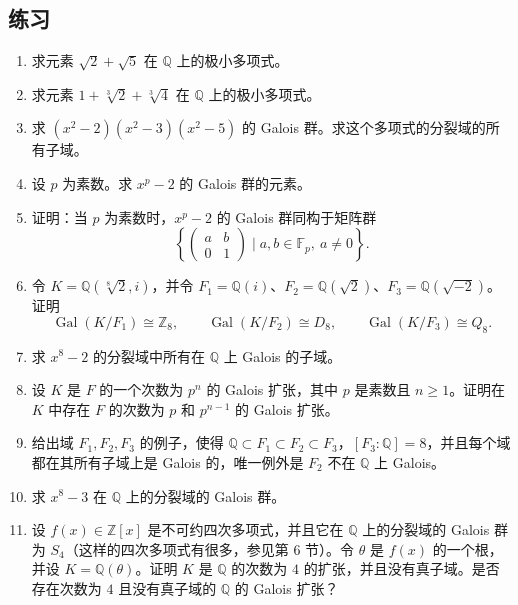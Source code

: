 \subsection*{练习}

\begin{enumerate}[label=\arabic*.]
\item 求元素 $\sqrt2+\sqrt5$ 在 $\mathbb Q$ 上的极小多项式。

\item 求元素 $1+\sqrt[3]{2}+\sqrt[3]{4}$ 在 $\mathbb Q$ 上的极小多项式。

\item 求 $(x^2-2)(x^2-3)(x^2-5)$ 的 Galois 群。求这个多项式的分裂域的所有子域。

\item 设 $p$ 为素数。求 $x^p-2$ 的 Galois 群的元素。

\item 证明：当 $p$ 为素数时，$x^p-2$ 的 Galois 群同构于矩阵群
\[
\left\{\begin{pmatrix}a&b\\0&1\end{pmatrix}\mid a,b\in\mathbb F_p,
\ a\neq0\right\}.
\]

\item 令 $K=\mathbb Q(\sqrt[8]{2},i)$，并令 $F_1=\mathbb Q(i)$、$F_2=\mathbb Q(\sqrt2)$、$F_3=\mathbb Q(\sqrt{-2})$。证明
\[
\operatorname{Gal}(K/F_1)\cong\mathbb Z_8,
\qquad
\operatorname{Gal}(K/F_2)\cong D_8,
\qquad
\operatorname{Gal}(K/F_3)\cong Q_8.
\]

\item 求 $x^8-2$ 的分裂域中所有在 $\mathbb Q$ 上 Galois 的子域。

\item 设 $K$ 是 $F$ 的一个次数为 $p^n$ 的 Galois 扩张，其中 $p$ 是素数且 $n\geq1$。证明在 $K$ 中存在 $F$ 的次数为 $p$ 和 $p^{n-1}$ 的 Galois 扩张。

\item 给出域 $F_1,F_2,F_3$ 的例子，使得 $\mathbb Q\subset F_1\subset F_2\subset F_3$，$[F_3:\mathbb Q]=8$，并且每个域都在其所有子域上是 Galois 的，唯一例外是 $F_2$ 不在 $\mathbb Q$ 上 Galois。

\item 求 $x^8-3$ 在 $\mathbb Q$ 上的分裂域的 Galois 群。

\item 设 $f(x)\in\mathbb Z[x]$ 是不可约四次多项式，并且它在 $\mathbb Q$ 上的分裂域的 Galois 群为 $S_4$（这样的四次多项式有很多，参见第 6 节）。令 $\theta$ 是 $f(x)$ 的一个根，并设 $K=\mathbb Q(\theta)$。证明 $K$ 是 $\mathbb Q$ 的次数为 $4$ 的扩张，并且没有真子域。是否存在次数为 $4$ 且没有真子域的 $\mathbb Q$ 的 Galois 扩张？


\end{enumerate}
